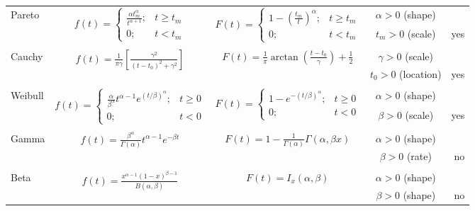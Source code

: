 \begin{table}[t!]
{\begin{tabular}{lcccr}
\\
\multirow{2}{*}{Pareto} & \multirow{2}{*}{$f(t) = \begin{cases} \frac{\alpha t_{m}^\alpha}{t^{\alpha + 1}} ;& t \geq t_{m} \\ 0;& t < t_{m} \end{cases} $ } & \multirow{2}{*}{$F(t) = \begin{cases} 1 - (\frac{t_{m}}{t})^\alpha ;& t \geq t_{m} \\ 0;& t < t_{m}\end{cases} $} &  $\alpha > 0$ (shape)  \\ & &  &  $t_{m} > 0$ (scale)   & yes \\ 
\\ 
\multirow{2}{*}{Cauchy} & \multirow{2}{*}{ $f(t) = \frac{1}{\pi \gamma}[\frac{\gamma^2}{(t - t_{0})^{2} + \gamma^{2}}]$ } & \multirow{2}{*}{ $F(t) = \frac{1}{\pi}\arctan( \frac{t - t_{0}}{\gamma} ) + \frac{1}{2}  $ } &  $\gamma > 0$ (scale) \\ &  &   & $t_{0} > 0$ (location) & yes \\  
\\
\multirow{2}{*}{Weibull} & \multirow{2}{*}{ $f(t) = \begin{cases} \frac{\alpha}{\beta^\alpha}t^{\alpha - 1}e^{(t/\beta)^{\alpha}}; & t \geq 0 \\ 0; & t < 0 \end{cases}$  } & \multirow{2}{*}{ $F(t) = \begin{cases} 1 - e^{-(t/\beta)^{\alpha}}; & t \geq 0 \\ 0 ; & t < 0  \end{cases}$ } & $\alpha  > 0 $ (shape) \\ &  &  & $\beta > 0$ (scale)  & yes \\
\\
\multirow{2}{*}{Gamma} & \multirow{2}{*}{ $ f(t) = \frac{\beta^{\alpha}}{\Gamma(\alpha)}t^{\alpha - 1}e^{-\beta t}  $ } & \multirow{2}{*}{$ F(t) = 1 - \frac{1}{\Gamma(\alpha)}\Gamma(\alpha, \beta x) $} & $\alpha > 0$ (shape) \\ &  &  & $\beta > 0$ (rate) & no \\
\\ 
\multirow{2}{*}{Beta} & \multirow{2}{*}{ $ f(t) = \frac{x^{\alpha - 1}(1 - x)^{\beta - 1}}{B(\alpha, \beta)} $ } & \multirow{2}{*}{ $ F(t) = I_{x}(\alpha, \beta) $ } &  $\alpha > 0$ (shape) \\ &  &  & $\beta > 0$ (shape) & no \\ 

\end{tabular}}
\end{table}
